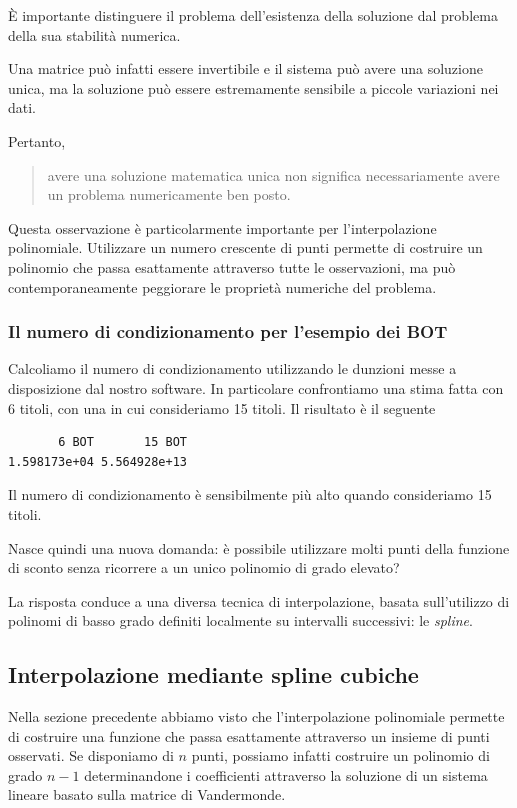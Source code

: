 È importante distinguere il problema dell'esistenza della soluzione
dal problema della sua stabilità numerica.

Una matrice può infatti essere invertibile e il sistema può avere una
soluzione unica, ma la soluzione può essere estremamente sensibile a
piccole variazioni nei dati.

Pertanto,

\begin{quote}
avere una soluzione matematica unica non significa necessariamente
avere un problema numericamente ben posto.
\end{quote}

Questa osservazione è particolarmente importante per l'interpolazione
polinomiale. Utilizzare un numero crescente di punti permette di
costruire un polinomio che passa esattamente attraverso tutte le
osservazioni, ma può contemporaneamente peggiorare le proprietà
numeriche del problema.

\subsubsection{Il numero di condizionamento per l'esempio dei BOT}

Calcoliamo il numero di condizionamento utilizzando le dunzioni messe a disposizione dal nostro software.
In particolare confrontiamo una stima fatta con 6 titoli, con una in cui consideriamo 15 titoli. Il risultato è il seguente

\begin{verbatim}
       6 BOT       15 BOT 
1.598173e+04 5.564928e+13
\end{verbatim}

Il numero di condizionamento è sensibilmente più alto quando consideriamo 15 titoli.

Nasce quindi una nuova domanda: è possibile utilizzare molti punti
della funzione di sconto senza ricorrere a un unico polinomio di
grado elevato?

La risposta conduce a una diversa tecnica di interpolazione, basata
sull'utilizzo di polinomi di basso grado definiti localmente su
intervalli successivi: le \emph{spline}.

\subsection{Interpolazione mediante spline cubiche}
\label{sec:spline}

Nella sezione precedente abbiamo visto che l'interpolazione polinomiale
permette di costruire una funzione che passa esattamente attraverso un
insieme di punti osservati. Se disponiamo di $n$ punti, possiamo infatti
costruire un polinomio di grado $n-1$ determinandone i coefficienti
attraverso la soluzione di un sistema lineare basato sulla matrice di
Vandermonde.

